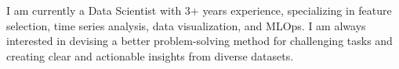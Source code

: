 
\begin{cvparagraph}

I am currently a Data Scientist with 3+ years experience, specializing in feature selection, time series analysis, data visualization, and MLOps. I am always interested in devising a better problem-solving method for challenging tasks and creating clear and actionable insights from diverse datasets.
\end{cvparagraph}
